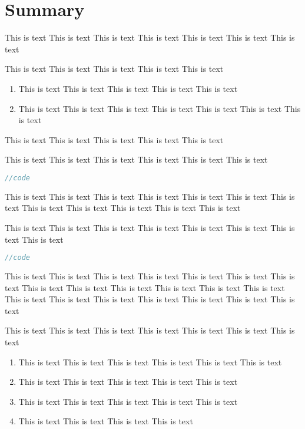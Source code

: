 \documentclass[a4paper]{uestcreport}
\begin{document}
\part{Summary}
This is text This is text This is text This is text This is text This is text This is text 

This is text This is text This is text This is text This is text 
\begin{enumerate}
    \item This is text This is text This is text This is text This is text 
    \item This is text This is text This is text This is text This is text This is text This is text 
\end{enumerate}

This is text This is text This is text This is text This is text 

This is text This is text This is text This is text This is text This is text 
\begin{lstlisting}[language=C++]
//code
\end{lstlisting}

This is text This is text This is text This is text This is text This is text This is text This is text This is text This is text This is text This is text 

This is text This is text This is text This is text This is text This is text This is text This is text 
\begin{lstlisting}[language=C++]
//code
\end{lstlisting}

This is text This is text This is text This is text This is text This is text This is text This is text This is text This is text This is text This is text This is text This is text This is text This is text This is text This is text This is text This is text 

This is text This is text This is text This is text This is text This is text This is text 
\begin{enumerate}
    \item This is text This is text This is text This is text This is text This is text 
    \item This is text This is text This is text This is text This is text 
    \item This is text This is text This is text This is text This is text 
    \item This is text This is text This is text This is text 
\end{enumerate}
\end{document}
